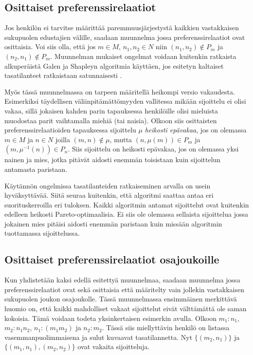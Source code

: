 \documentclass[gradu, twoside]{tktltiki}
\begin{document}
\subsection{Osittaiset preferenssirelaatiot}

Jos henkilön ei tarvitse määrittää paremmuusjärjestystä kaikkien
vastakkaisen sukupuolen edustajien välille, saadaan muunnelma jossa
preferenssirelaatiot ovat osittaisia. Voi siis olla, että jos $m \in
M$, $n_1,n_2 \in N$ niin $(n_1, n_2) \notin P_m$ ja $(n_2, n_1) \notin
P_m$. Muunnelman mukaiset ongelmat voidaan kuitenkin ratkaista
alkuperäistä Galen ja Shapleyn algoritmia käyttäen, jos esitetyn
kaltaiset tasatilanteet ratkaistaan satunnaisesti \cite{gusfield89}.

Myös tässä muunnelmassa on tarpeen määritellä heikompi versio
vakaudesta. Esimerkiksi täydellisen väliinpitämättömyyden vallitessa
mikään sijoittelu ei olisi vakaa, sillä jokaisen kahden parin
tapauksessa henkilöille olisi mieluista muodostaa parit vaihtamalla
miehiä (tai naisia). Olkoon siis osittaisten preferenssirelaatioiden
tapauksessa sijoittelu $\mu$ \emph{heikosti epävakaa}, jos on olemassa
$m \in M$ ja $n \in N$ joilla $(m, n) \notin \mu$, mutta $(n, \mu(m))
\in P_m$ ja $(m, \mu^{-1}(n)) \in P_n$. Siis sijoittelu on heikosti
epävakaa, jos on olemassa yksi nainen ja mies, jotka pitävät aidosti
enemmän toisistaan kuin sijoittelun antamasta paristaan.
\cite{gusfield89}

Käytännön ongelmissa tasatilanteiden ratkaiseminen arvalla on usein
hyväksyttävää. Siitä seuraa kuitenkin, että algoritmi saattaa antaa
eri suorituskerroilla eri tuloksen. Kaikki algoritmin antamat
sijoittelut ovat kuitenkin edelleen heikosti Pareto-optimaalisia. Ei
siis ole olemassa sellaista sijoittelua jossa jokainen mies pitäisi
aidosti enemmän paristaan kuin missään algoritmin tuottamassa
sijoittelussa.

\subsection{Osittaiset preferenssirelaatiot osajoukoille}

Kun yhdistetään kaksi edellä esitettyä muunnelmaa, saadaan muunnelma
jossa preferenssirelaatiot ovat sekä osittaisia että määritelty vain
jollekin vastakkaisen sukupuolen joukon osajoukolle. Tässä
muunnelmassa ensimmäinen merkittävä huomio on, että kaikki mahdolliset
vakaat sijoittelut eivät välttämättä ole saman kokoisia. Tämä voidaan
todeta yksinkertaisen esimerkin avulla. Olkoon $m_1: n_1$, $m_2: n_1
n_2$, $n_1: (m_1 m_2)$ ja $n_2: m_2$. Tässä siis miellyttävin henkilö
on listassa vasemmanpuolimmaisena ja sulut kuvaavat tasatilannetta.
Nyt $\{(m_2, n_1)\}$ ja $\{(m_1, n_1), (m_2, n_2)\}$ ovat vakaita
sijoitteluja. \cite{manlove02}
\end{document}
